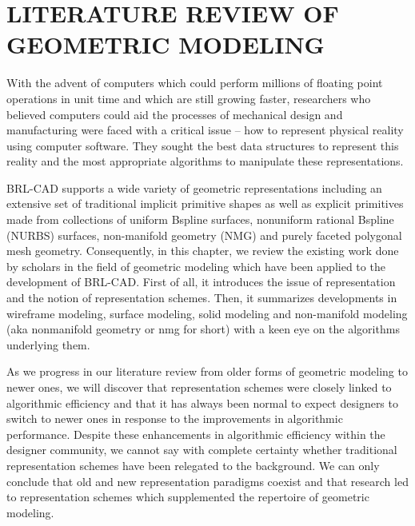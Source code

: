 \chapter{LITERATURE REVIEW OF GEOMETRIC MODELING}
\label{Literature Review}


\hspace{30} With the advent of computers which could perform millions of floating
point operations in unit time and which are still growing faster, researchers who
believed computers could aid the processes of mechanical design and
manufacturing were faced with a critical issue – how to represent physical
reality using computer software. They sought the best data structures to
represent this reality and the most appropriate algorithms to manipulate these representations.

\hspace{30} BRL-­CAD supports a wide variety of geometric representations including an 
extensive set of traditional implicit primitive shapes as well as explicit primitives
made from collections of uniform B­spline surfaces, non­uniform rational B­spline (NURBS)
surfaces, n­on-manifold   geometry   (NMG)   and purely faceted polygonal mesh geometry.
Consequently, in this chapter, we review the existing work done by scholars in the 
field of geometric modeling which have been applied to the development of BRL-­CAD. 
First of all, it introduces the issue of representation and the notion of representation
 schemes. Then, it summarizes developments in wireframe modeling, surface modeling, solid
modeling and non­-manifold modeling (aka non­manifold geometry or nmg for short) with a keen
 eye on the algorithms underlying them.

\hspace{30} As we progress in our literature review from older forms of geometric
modeling to newer ones, we will discover that representation schemes were
closely linked to algorithmic efficiency and that it has always been normal to
expect designers to switch to newer ones in response to the improvements in
algorithmic performance. Despite these enhancements in algorithmic efficiency
within the designer community, we cannot say with complete certainty whether
traditional representation schemes have been relegated to the background. We
can only conclude that old and new representation paradigms co­exist and that
research led to representation schemes which supplemented the repertoire of
geometric modeling.  

